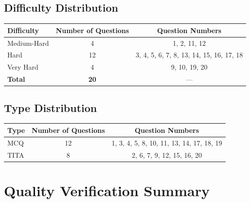\documentclass[11pt,a4paper]{article}
\begin{document}
\subsection*{Difficulty Distribution}

\begin{center}
\renewcommand{\arraystretch}{1.2}
\begin{tabular}{|l|c|c|}
\hline
\textbf{Difficulty} & \textbf{Number of Questions} & \textbf{Question Numbers} \\
\hline
Medium-Hard & 4  & 1, 2, 11, 12 \\
Hard        & 12 & 3, 4, 5, 6, 7, 8, 13, 14, 15, 16, 17, 18 \\
Very Hard   & 4  & 9, 10, 19, 20 \\
\hline
\textbf{Total} & \textbf{20} & --- \\
\hline
\end{tabular}
\end{center}

\subsection*{Type Distribution}

\begin{center}
\renewcommand{\arraystretch}{1.2}
\begin{tabular}{|l|c|c|}
\hline
\textbf{Type} & \textbf{Number of Questions} & \textbf{Question Numbers} \\
\hline
MCQ  & 12 & 1, 3, 4, 5, 8, 10, 11, 13, 14, 17, 18, 19 \\
TITA & 8  & 2, 6, 7, 9, 12, 15, 16, 20 \\
\hline
\end{tabular}
\end{center}

\newpage

\section*{Quality Verification Summary}
\end{document}
